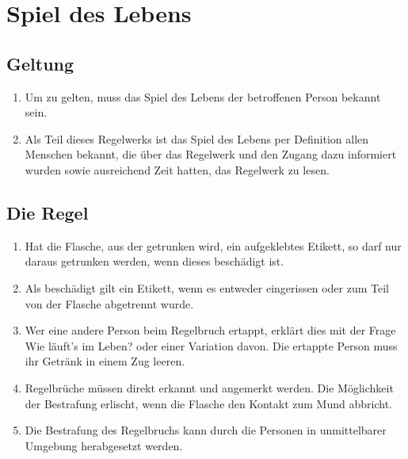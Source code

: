 \chapter{Spiel des Lebens}
\section{Geltung}
\begin{enumerate}[label={(\arabic*)}]
    \item
    Um zu gelten, muss das Spiel des Lebens der betroffenen Person bekannt sein.

    \item
    Als Teil dieses Regelwerks ist das Spiel des Lebens per Definition allen Menschen bekannt, die über das Regelwerk und den Zugang dazu informiert wurden sowie ausreichend Zeit hatten, das Regelwerk zu lesen. 
\end{enumerate}

\section{Die Regel}
\begin{enumerate}[label={(\arabic*)}]
    \item
    Hat die Flasche, aus der getrunken wird, ein aufgeklebtes Etikett, so darf nur daraus getrunken werden, wenn dieses beschädigt ist.

    \item
    Als beschädigt gilt ein Etikett, wenn es entweder eingerissen oder zum Teil von der Flasche abgetrennt wurde.

    \item
    Wer eine andere Person beim Regelbruch ertappt, erklärt dies mit der Frage \glqq{}Wie läuft's im Leben?\grqq{} oder einer Variation davon.
    Die ertappte Person muss ihr Getränk in einem Zug leeren.

    \item
    Regelbrüche müssen direkt erkannt und angemerkt werden.
    Die Möglichkeit der Bestrafung erlischt, wenn die Flasche den Kontakt zum Mund abbricht.

    \item
    Die Bestrafung des Regelbruchs kann durch die Personen in unmittelbarer Umgebung herabgesetzt werden.
\end{enumerate}
